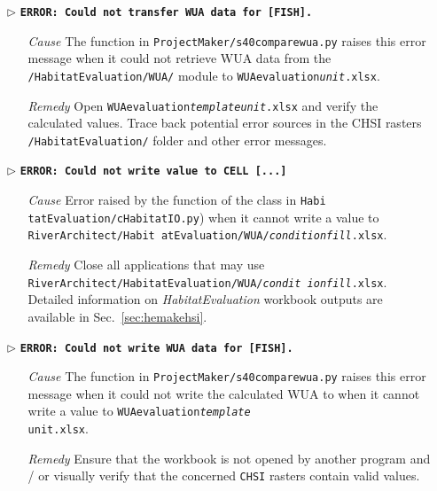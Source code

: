 \begin{itemize}
	\item[$\triangleright$]\textbf{\texttt{ERROR: Could not transfer WUA data for [FISH].}}
	\begin{itemize}
		\item[\textit{Cause}\hspace{0.27cm}] The  function in \texttt{ProjectMaker/s40{\myUnderscore}compare{\myUnderscore}wua.py} raises this error message when it could not retrieve WUA data from the \texttt{/HabitatEvaluation/WUA/} module to  \texttt{WUA{\myUnderscore}evaluation\textit{{\myUnderscore}unit}.xlsx}.
		\item[\textit{Remedy}] Open \texttt{WUA{\myUnderscore}evaluation\textit{{\myUnderscore}template{\myUnderscore}unit}.xlsx} and verify the calculated values. Trace back potential error sources in the CHSI rasters \texttt{/HabitatEvaluation/} folder and other error messages.\\
	\end{itemize}	
	
	\item[$\triangleright$]\textbf{\texttt{ERROR: Could not write value to CELL [...]}}
	\begin{itemize}
		\item[\textit{Cause}\hspace{0.27cm}] Error raised by the  function of the  class in \texttt{Habi tatEvaluation/cHabitatIO.py}) when it cannot write a value to \texttt{RiverArchitect/Habit atEvaluation/WUA/\textit{condition{\myUnderscore}fill}.xlsx}.
		\item[\textit{Remedy}] Close all applications that may use \texttt{RiverArchitect/HabitatEvaluation/WUA/\textit{condit ion}{\myUnderscore}\textit{fill}.xlsx}. Detailed information on \textit{HabitatEvaluation} workbook outputs are available in Sec.~\ref{sec:hemakehsi}.\\
	\end{itemize}
	
	\item[$\triangleright$]\textbf{\texttt{ERROR: Could not write WUA data for [FISH].}}
	\begin{itemize}
		\item[\textit{Cause}\hspace{0.27cm}] The  function in \texttt{ProjectMaker/s40{\myUnderscore}compare{\myUnderscore}wua.py} raises this error message when it could not write the calculated WUA to when it cannot write a value to \texttt{WUA{\myUnderscore}evaluation\textit{{\myUnderscore}template{\myUnderscore}}\\\texttt{unit}.xlsx}.
		\item[\textit{Remedy}] Ensure that the workbook is not opened by another program and / or visually verify that the concerned \texttt{CHSI} rasters contain valid values.\\
	\end{itemize}
	

\end{itemize}
